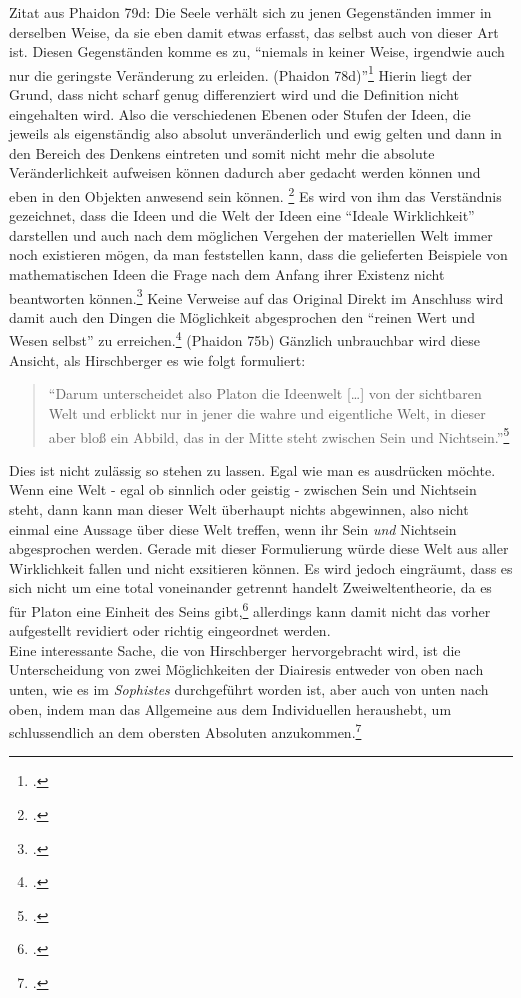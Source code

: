 \documentclass[12pt]{article}
\newcommand*{\zitatblock}[1]{%
    \begin{quote}
    \fontsize{10}{12}\selectfont
    \setlength{\parskip}{1.0em}
    #1
    \end{quote}
}
\begin{document}
Zitat aus Phaidon 79d: Die Seele verhält sich zu jenen Gegenständen immer in derselben Weise, da sie eben damit etwas erfasst, das selbst auch von dieser Art ist. Diesen Gegenständen komme es zu, \enquote{niemals in keiner Weise, irgendwie auch nur die geringste Veränderung zu erleiden. (Phaidon 78d)}\footcite[][S. 97]{Hirschberger}
Hierin liegt der Grund, dass nicht scharf genug differenziert wird und die Definition nicht eingehalten wird. Also die verschiedenen Ebenen oder Stufen der Ideen, die jeweils als eigenständig also absolut unveränderlich und ewig gelten und dann in den Bereich des Denkens eintreten und somit nicht mehr die absolute Veränderlichkeit aufweisen können dadurch aber gedacht werden können und eben in den Objekten anwesend sein können. \footcite[vgl.][S. 180f.]{Kutschera}
Es wird von ihm das Verständnis gezeichnet, dass die Ideen und die Welt der Ideen eine \enquote{Ideale Wirklichkeit} darstellen und auch nach dem möglichen Vergehen der materiellen Welt immer noch existieren mögen, da man feststellen kann, dass die gelieferten Beispiele von mathematischen Ideen die Frage nach dem Anfang ihrer Existenz nicht beantworten können.\footcite[vgl.][S. 99]{Hirschberger} Keine Verweise auf das Original
Direkt im Anschluss wird damit auch den Dingen die Möglichkeit abgesprochen den \enquote{reinen Wert und Wesen selbst} zu erreichen.\footcite[vgl.][S. 100]{Hirschberger} (Phaidon 75b)
Gänzlich unbrauchbar wird diese Ansicht, als Hirschberger es wie folgt formuliert:
\zitatblock{\enquote{Darum unterscheidet also Platon die Ideenwelt [\dots] von der sichtbaren Welt und erblickt nur in jener die wahre und eigentliche Welt, in dieser aber bloß ein Abbild, das in der Mitte steht zwischen Sein und Nichtsein.}\footcite[vgl.][S. 100]{Hirschberger}}
Dies ist nicht zulässig so stehen zu lassen. Egal wie man es ausdrücken möchte. Wenn eine Welt - egal ob sinnlich oder geistig - zwischen Sein und Nichtsein steht, dann kann man dieser Welt überhaupt nichts abgewinnen, also nicht einmal eine Aussage über diese Welt treffen, wenn ihr Sein \emph{und} Nichtsein abgesprochen werden. 
Gerade mit dieser Formulierung würde diese Welt aus aller Wirklichkeit fallen und nicht exsitieren können.
Es wird jedoch eingräumt, dass es sich nicht um eine total voneinander getrennt handelt Zweiweltentheorie, da es für Platon eine Einheit des Seins gibt,\footcite[vgl][S. 100]{Hirschberger} allerdings kann damit nicht das vorher aufgestellt revidiert oder richtig eingeordnet werden.\\
Eine interessante Sache, die von Hirschberger hervorgebracht wird, ist die Unterscheidung von zwei Möglichkeiten der Diairesis entweder von oben nach unten, wie es im \emph{Sophistes} durchgeführt worden ist, aber auch von unten nach oben, indem man das Allgemeine aus dem Individuellen heraushebt, um schlussendlich an dem obersten Absoluten anzukommen.\footcite[vgl.][S. 106f.]{Hirschberger} 
\end{document}

